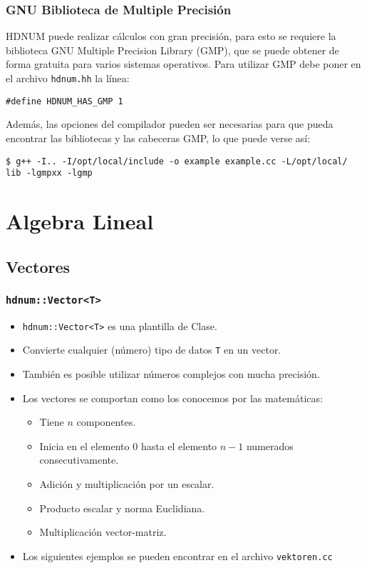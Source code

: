 \subsubsection*{GNU Biblioteca de Multiple Precisión}

HDNUM puede realizar cálculos con gran precisión, para esto se requiere la biblioteca GNU Multiple Precision Library (GMP), que se puede obtener de forma gratuita para varios sistemas operativos. Para utilizar GMP debe poner en el archivo \lstinline{hdnum.hh} la línea:
\begin{lstlisting}[basicstyle=\ttfamily\small,frame=single]
#define HDNUM_HAS_GMP 1
\end{lstlisting}
Además, las opciones del compilador pueden ser necesarias para que pueda encontrar las bibliotecas y las cabeceras GMP, lo que puede verse así:
\begin{lstlisting}[basicstyle=\ttfamily\footnotesize,frame=single]
$ g++ -I.. -I/opt/local/include -o example example.cc -L/opt/local/
lib -lgmpxx -lgmp
\end{lstlisting}

\section{Algebra Lineal}

\subsection{Vectores}

\begin{frame}[fragile]
\frametitle{\lstinline{hdnum::Vector<T>}}
\begin{itemize}
\item \lstinline{hdnum::Vector<T>} es una plantilla de Clase.
\item Convierte cualquier (número)  tipo de datos \lstinline{T} en un vector. 
\item También es posible utilizar números complejos con mucha precisión.
\item Los vectores se comportan como los conocemos por las matemáticas:
\begin{itemize}
\item Tiene $n$ componentes.
\item Inicia en el elemento $0$ hasta el elemento $n-1$ numerados consecutivamente.
\item Adición y multiplicación por un escalar.
\item Producto escalar y norma Euclidiana.
\item Multiplicación vector-matriz.
\end{itemize}
\item Los siguientes ejemplos se pueden encontrar en el archivo \lstinline{vektoren.cc}
\end{itemize}
\end{frame}

